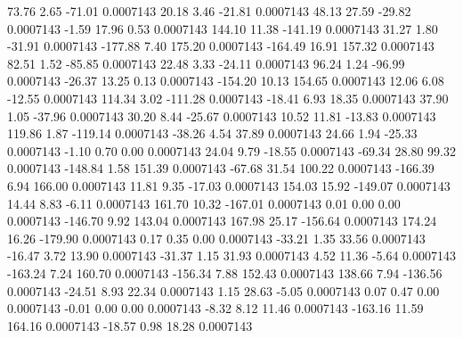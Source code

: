        73.76        2.65      -71.01     0.0007143
       20.18        3.46      -21.81     0.0007143
       48.13       27.59      -29.82     0.0007143
       -1.59       17.96        0.53     0.0007143
      144.10       11.38     -141.19     0.0007143
       31.27        1.80      -31.91     0.0007143
     -177.88        7.40      175.20     0.0007143
     -164.49       16.91      157.32     0.0007143
       82.51        1.52      -85.85     0.0007143
       22.48        3.33      -24.11     0.0007143
       96.24        1.24      -96.99     0.0007143
      -26.37       13.25        0.13     0.0007143
     -154.20       10.13      154.65     0.0007143
       12.06        6.08      -12.55     0.0007143
      114.34        3.02     -111.28     0.0007143
      -18.41        6.93       18.35     0.0007143
       37.90        1.05      -37.96     0.0007143
       30.20        8.44      -25.67     0.0007143
       10.52       11.81      -13.83     0.0007143
      119.86        1.87     -119.14     0.0007143
      -38.26        4.54       37.89     0.0007143
       24.66        1.94      -25.33     0.0007143
       -1.10        0.70        0.00     0.0007143
       24.04        9.79      -18.55     0.0007143
      -69.34       28.80       99.32     0.0007143
     -148.84        1.58      151.39     0.0007143
      -67.68       31.54      100.22     0.0007143
     -166.39        6.94      166.00     0.0007143
       11.81        9.35      -17.03     0.0007143
      154.03       15.92     -149.07     0.0007143
       14.44        8.83       -6.11     0.0007143
      161.70       10.32     -167.01     0.0007143
        0.01        0.00        0.00     0.0007143
     -146.70        9.92      143.04     0.0007143
      167.98       25.17     -156.64     0.0007143
      174.24       16.26     -179.90     0.0007143
        0.17        0.35        0.00     0.0007143
      -33.21        1.35       33.56     0.0007143
      -16.47        3.72       13.90     0.0007143
      -31.37        1.15       31.93     0.0007143
        4.52       11.36       -5.64     0.0007143
     -163.24        7.24      160.70     0.0007143
     -156.34        7.88      152.43     0.0007143
      138.66        7.94     -136.56     0.0007143
      -24.51        8.93       22.34     0.0007143
        1.15       28.63       -5.05     0.0007143
        0.07        0.47        0.00     0.0007143
       -0.01        0.00        0.00     0.0007143
       -8.32        8.12       11.46     0.0007143
     -163.16       11.59      164.16     0.0007143
      -18.57        0.98       18.28     0.0007143

